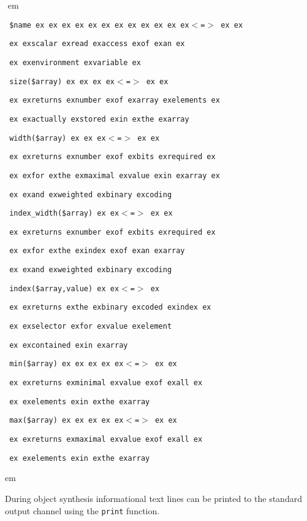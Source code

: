 \documentclass[a4paper,12pt,twoside,english]{article}
\def\s{\hskip 1.15 ex}
\begin{document}
\begin{description}
\begin{description}
\def\prefskipu{}\def\prefskipo{}\def\prefskipa{}\def\prefskipu{\hskip10pt}\def\prefskipo{\hskip10pt}\def\prefskipa{\hskip30pt}\def\content{
\vskip-5pt{\parindent0pt\parbox{\linewidth}{\tt\smallsize\hskip10pt \$name\s \s \s \s \s \s \s \s \s \s \s \s $<$=$>$\s \s }}
\vskip-5pt{\parindent0pt\parbox{\linewidth}{\tt\smallsize\hskip10pt \s \s scalar\s read\s access\s of\s an\s }}
\vskip-5pt{\parindent0pt\parbox{\linewidth}{\tt\smallsize\hskip10pt \s \s environment\s variable\s }}
\vskip-5pt{\parindent0pt\parbox{\linewidth}{\tt\smallsize\hskip10pt size(\$array)\s \s \s \s $<$=$>$\s \s }}
\vskip-5pt{\parindent0pt\parbox{\linewidth}{\tt\smallsize\hskip10pt \s \s returns\s number\s of\s array\s elements\s }}
\vskip-5pt{\parindent0pt\parbox{\linewidth}{\tt\smallsize\hskip10pt \s \s actually\s stored\s in\s the\s array}}
\vskip-5pt{\parindent0pt\parbox{\linewidth}{\tt\smallsize\hskip10pt width(\$array)\s \s \s $<$=$>$\s \s }}
\vskip-5pt{\parindent0pt\parbox{\linewidth}{\tt\smallsize\hskip10pt \s \s returns\s number\s of\s bits\s required\s }}
\vskip-5pt{\parindent0pt\parbox{\linewidth}{\tt\smallsize\hskip10pt \s \s for\s the\s maximal\s value\s in\s array\s }}
\vskip-5pt{\parindent0pt\parbox{\linewidth}{\tt\smallsize\hskip10pt \s \s and\s weighted\s binary\s coding}}
\vskip-5pt{\parindent0pt\parbox{\linewidth}{\tt\smallsize\hskip10pt index\_width(\$array)\s \s $<$=$>$\s \s }}
\vskip-5pt{\parindent0pt\parbox{\linewidth}{\tt\smallsize\hskip10pt \s \s returns\s number\s of\s bits\s required\s }}
\vskip-5pt{\parindent0pt\parbox{\linewidth}{\tt\smallsize\hskip10pt \s \s for\s the\s index\s of\s an\s array}}
\vskip-5pt{\parindent0pt\parbox{\linewidth}{\tt\smallsize\hskip10pt \s \s and\s weighted\s binary\s coding}}
\vskip-5pt{\parindent0pt\parbox{\linewidth}{\tt\smallsize\hskip10pt index(\$array,value)\s \s $<$=$>$\s }}
\vskip-5pt{\parindent0pt\parbox{\linewidth}{\tt\smallsize\hskip10pt \s \s returns\s the\s binary\s coded\s index\s }}
\vskip-5pt{\parindent0pt\parbox{\linewidth}{\tt\smallsize\hskip10pt \s \s selector\s for\s value\s element}}
\vskip-5pt{\parindent0pt\parbox{\linewidth}{\tt\smallsize\hskip10pt \s \s contained\s in\s array}}
\vskip-5pt{\parindent0pt\parbox{\linewidth}{\tt\smallsize\hskip10pt min(\$array)\s \s \s \s \s $<$=$>$\s \s }}
\vskip-5pt{\parindent0pt\parbox{\linewidth}{\tt\smallsize\hskip10pt \s \s returns\s minimal\s value\s of\s all\s }}
\vskip-5pt{\parindent0pt\parbox{\linewidth}{\tt\smallsize\hskip10pt \s \s elements\s in\s the\s array}}
\vskip-5pt{\parindent0pt\parbox{\linewidth}{\tt\smallsize\hskip10pt max(\$array)\s \s \s \s \s $<$=$>$\s \s }}
\vskip-5pt{\parindent0pt\parbox{\linewidth}{\tt\smallsize\hskip10pt \s \s returns\s maximal\s value\s of\s all\s }}
\vskip-5pt{\parindent0pt\parbox{\linewidth}{\tt\smallsize\hskip10pt \s \s elements\s in\s the\s array}}
}
$ $
 em
\content
{} em
\item[\colorit{\bf Printing}] $ $\\
During object synthesis informational text lines can be printed to the standard output channel using the {\tt print} function.


\end{description}
\end{description}
\end{document}
